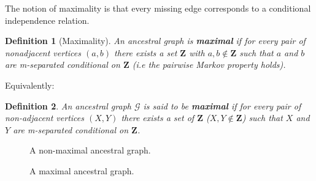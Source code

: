 \documentclass[a4paper]{article}
\newtheorem{definition}{Definition}
\begin{document}
The notion of maximality is that every missing edge corresponds to a conditional independence relation. 

\begin{definition}[Maximality]
	An ancestral graph is \textbf{maximal} if for every pair of nonadjacent vertices $(a, b)$ there exists a set $\mathbf{Z}$ with $a, b \not \in \mathbf{Z}$ such that $a$ and $b$ are m-separated conditional on $\mathbf{Z}$ (i.e the pairwise Markov property holds).
\end{definition}

Equivalently:

\begin{definition}
	An ancestral graph $\mathcal{G}$ is said to be \textbf{maximal} if for every pair of non-adjacent vertices $(X,Y)$ there exists a set of $\mathbf{Z}$ ($X,Y \not \in \mathbf{Z}$) such that $X$ and $Y$ are m-separated conditional on $\mathbf{Z}$.
\end{definition}

\begin{multicols}{2}
	\begin{minipage}{\linewidth}
		\begin{figure}[H]
			\centering
			\caption{A non-maximal ancestral graph.}
			\label{fig:non-maximal-ancestral}
		\end{figure}
	\end{minipage}
	
	\columnbreak
	
	\begin{minipage}{\linewidth}
		\begin{figure}[H]
			\centering
			\caption{A maximal ancestral graph.}
			\label{fig:non-maximal-vs-maximal}
		\end{figure}
	\end{minipage}
\end{multicols}
\end{document}
